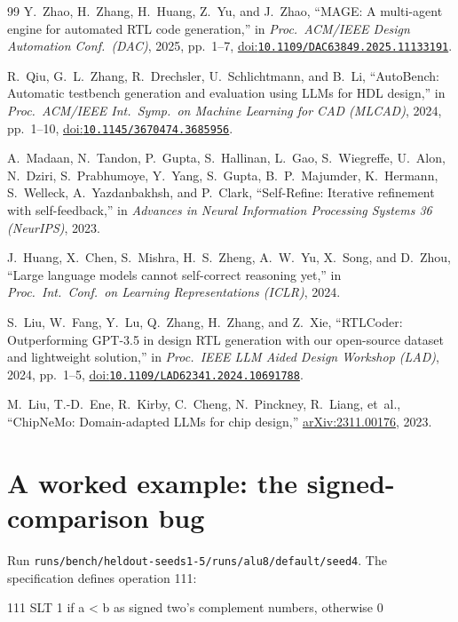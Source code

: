 \documentclass[11pt,a4paper]{article}
\newcommand{\doi}[1]{\href{https://doi.org/#1}{doi:\nolinkurl{#1}}}
\begin{document}
\begin{thebibliography}{99}
 Y.~Zhao, H.~Zhang, H.~Huang, Z.~Yu, and J.~Zhao, ``MAGE: A multi-agent engine for automated RTL code
generation,'' in \emph{Proc.\ ACM/IEEE Design Automation Conf.\ (DAC)}, 2025, pp.~1--7,
\doi{10.1109/DAC63849.2025.11133191}.

 R.~Qiu, G.~L.~Zhang, R.~Drechsler, U.~Schlichtmann, and B.~Li, ``AutoBench: Automatic testbench
generation and evaluation using LLMs for HDL design,'' in \emph{Proc.\ ACM/IEEE Int.\ Symp.\ on Machine Learning for
CAD (MLCAD)}, 2024, pp.~1--10, \doi{10.1145/3670474.3685956}.

 A.~Madaan, N.~Tandon, P.~Gupta, S.~Hallinan, L.~Gao, S.~Wiegreffe, U.~Alon, N.~Dziri,
S.~Prabhumoye, Y.~Yang, S.~Gupta, B.~P.~Majumder, K.~Hermann, S.~Welleck, A.~Yazdanbakhsh, and P.~Clark,
``Self-Refine: Iterative refinement with self-feedback,'' in \emph{Advances in Neural Information Processing Systems
36 (NeurIPS)}, 2023.

 J.~Huang, X.~Chen, S.~Mishra, H.~S.~Zheng, A.~W.~Yu, X.~Song, and D.~Zhou, ``Large language
models cannot self-correct reasoning yet,'' in \emph{Proc.\ Int.\ Conf.\ on Learning Representations (ICLR)}, 2024.

 S.~Liu, W.~Fang, Y.~Lu, Q.~Zhang, H.~Zhang, and Z.~Xie, ``RTLCoder: Outperforming GPT-3.5 in
design RTL generation with our open-source dataset and lightweight solution,'' in \emph{Proc.\ IEEE LLM Aided Design
Workshop (LAD)}, 2024, pp.~1--5, \doi{10.1109/LAD62341.2024.10691788}.

 M.~Liu, T.-D.~Ene, R.~Kirby, C.~Cheng, N.~Pinckney, R.~Liang, et~al., ``ChipNeMo:
Domain-adapted LLMs for chip design,'' \href{https://arxiv.org/abs/2311.00176}{arXiv:2311.00176}, 2023.

\end{thebibliography}
\endgroup

\FloatBarrier
\appendix
\section{A worked example: the signed-comparison bug}\label{app:example}

Run \texttt{runs/bench/heldout-seeds1-5/runs/alu8/default/seed4}. The specification defines operation 111:

\begin{code}
111  SLT   1 if a < b as signed two's complement numbers, otherwise 0
\end{code}
\end{document}
